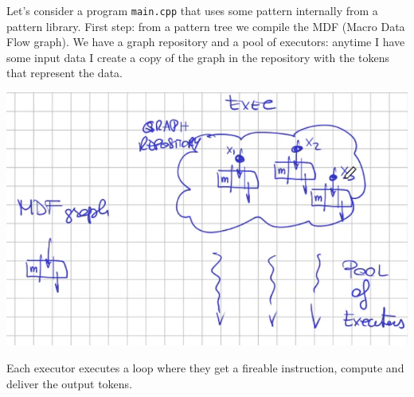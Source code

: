 \documentclass[10pt]{report}
\begin{document}
Let's consider a program \texttt{main.cpp} that uses some pattern internally from a pattern library. First step: from a pattern tree we compile the MDF (Macro Data Flow graph). We have a graph repository and a pool of executors: anytime I have some input data I create a copy of the graph in the repository with the tokens that represent the data.\begin{center}
	\includegraphics[scale=0.5]{8.png}
\end{center}
Each executor executes a loop where they get a fireable instruction, compute and deliver the output tokens.
\end{document}

